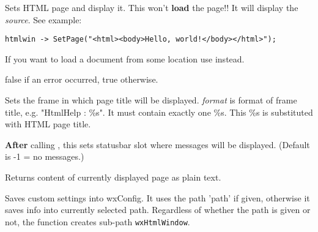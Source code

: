Sets HTML page and display it. This won't {\bf load} the page!!
It will display the {\it source}. See example:

\begin{verbatim}
htmlwin -> SetPage("<html><body>Hello, world!</body></html>");
\end{verbatim}

If you want to load a document from some location use 
 instead.




false if an error occurred, true otherwise.

\label{wxhtmlwindowsetrelatedframe}


Sets the frame in which page title will be displayed. {\it format} is format of
frame title, e.g. "HtmlHelp : \%s". It must contain exactly one \%s. This
\%s is substituted with HTML page title.

\label{wxhtmlwindowsetrelatedstatusbar}


{\bf After} calling ,
this sets statusbar slot where messages will be displayed.
(Default is -1 = no messages.)



\label{wxhtmlwindowtotext}


Returns content of currently displayed page as plain text.

\label{wxhtmlwindowwritecustomization}


Saves custom settings into wxConfig. It uses the path 'path'
if given, otherwise it saves info into currently selected path.
Regardless of whether the path is given or not, the function creates sub-path 
{\tt wxHtmlWindow}.

